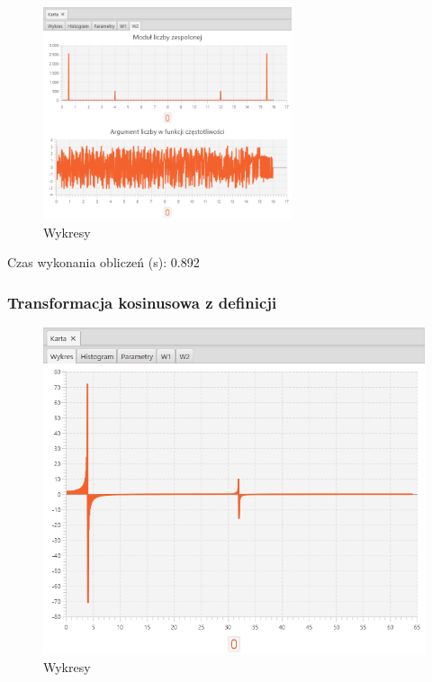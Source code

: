 \documentclass[12pt]{article}
\begin{document}
{{{                \begin{figure}[H]
                    \centering
                    \includegraphics[width=0.65\textwidth]{img/result/s3/03/W2_draw_3_sinus_sampling_trans_s3_data_205911.png}
                    \caption{Wykresy}
                \end{figure}

                Czas wykonania obliczeń (s): 0.892
            }
            \newpage

            \subsubsection{Transformacja kosinusowa z definicji} {

                \begin{figure}[H]
                    \centering
                    \includegraphics[width=\textwidth]{img/result/s3/04/data_draw_4_sinus_sampling_trans_s3_data_205925.png}
                    \caption{Wykresy}
                \end{figure}

}}}
\end{document}
